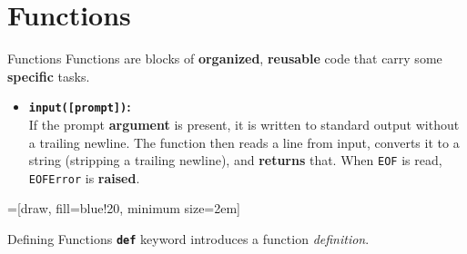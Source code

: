     \section{Functions}
        \begin{frame}{Functions}
            \pause
            \LARGE
            Functions are blocks of \textbf{organized}, \textbf{reusable} code that carry some \textbf{specific} tasks.
            \pause
            \begin{itemize}
                \item \textbf{\texttt{input([prompt])}:} \\
                \pause
                If the prompt \textbf<5->{argument} is present, it is written to standard output without a trailing newline. The function then reads a line from input, converts it to a string (stripping a trailing newline), and \textbf<5->{returns} that. When \texttt{EOF} is read, \texttt{EOFError} is \textbf<5->{raised}.   
            \end{itemize}

            \pause
            \pause

            \begin{center}
                =[draw, fill=blue!20, minimum size=2em]

            \end{center}
        \end{frame}   
 
        \begin{frame}{Defining Functions}
            \pause
            \LARGE
            \textbf{\texttt{def}} keyword introduces a function \textit{definition}.
            \normalsize
            \pause
            \inputminted[frame=single,framesep=2pt, lastline=8]{python3}{code-examples/function_def.py}
            \pause
            \inputminted[frame=single,framesep=2pt, lastline=8]{python3}{code-examples/function_def2.py}
            \pause
            \inputminted[frame=single,framesep=2pt, lastline=8]{python3}{code-examples/function_def3.py}
        \end{frame}


